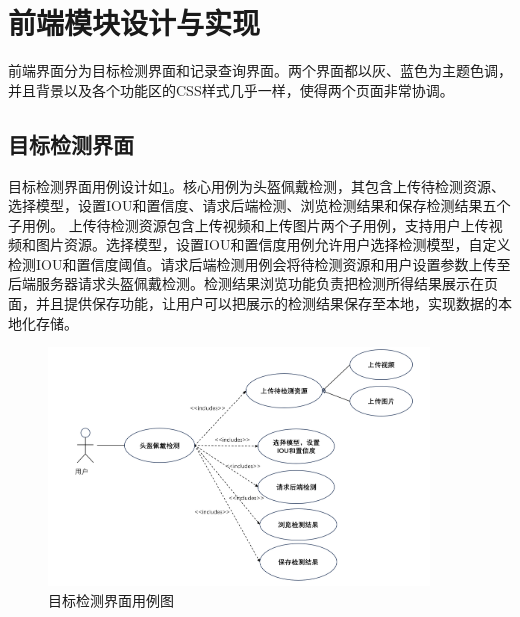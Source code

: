 \section{前端模块设计与实现}
前端界面分为目标检测界面和记录查询界面。两个界面都以灰、蓝色为主题色调，并且背景以及各个功能区的CSS样式几乎一样，使得两个页面非常协调。
\subsection{目标检测界面}
目标检测界面用例设计如\ref{fig:uml1}。核心用例为头盔佩戴检测，其包含上传待检测资源、选择模型，设置IOU和置信度、请求后端检测、浏览检测结果和保存检测结果五个子用例。
上传待检测资源包含上传视频和上传图片两个子用例，支持用户上传视频和图片资源。选择模型，设置IOU和置信度用例允许用户选择检测模型，自定义检测IOU和置信度阈值。请求后端检测用例会将待检测资源和用户设置参数上传至后端服务器请求头盔佩戴检测。检测结果浏览功能负责把检测所得结果展示在页面，并且提供保存功能，让用户可以把展示的检测结果保存至本地，实现数据的本地化存储。

\begin{figure}[!htb]
    \centering
    \includegraphics[width=0.9\textwidth]{figs/chap05/uml1.png}
    \caption{目标检测界面用例图}
    \label{fig:uml1}
\end{figure}

